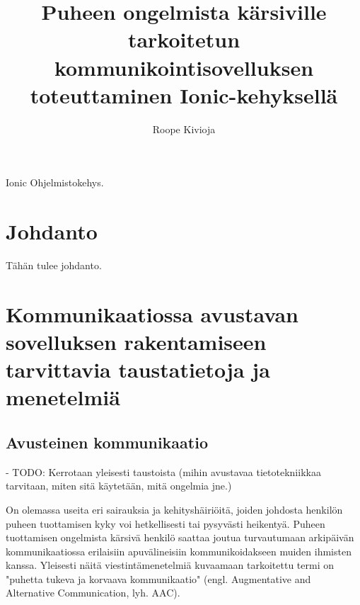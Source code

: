 \documentclass[utf8]{gradu3}
\begin{document}
\title{Puheen ongelmista kärsiville tarkoitetun kommunikointisovelluksen toteuttaminen Ionic-kehyksellä}

\author{Roope Kivioja}


\maketitle

\begin{thetermlist}
\item[Ionic] Ohjelmistokehys.
\end{thetermlist}

\mainmatter

\chapter{Johdanto}

Tähän tulee johdanto.

\chapter{Kommunikaatiossa avustavan sovelluksen rakentamiseen tarvittavia taustatietoja ja menetelmiä}

\section{Avusteinen kommunikaatio}

- TODO: Kerrotaan yleisesti taustoista (mihin avustavaa tietotekniikkaa tarvitaan, miten sitä käytetään, mitä ongelmia jne.)

On olemassa useita eri sairauksia ja kehityshäiriöitä, joiden johdosta henkilön puheen tuottamisen kyky voi hetkellisesti tai pysyvästi heikentyä. Puheen tuottamisen ongelmista kärsivä henkilö saattaa joutua turvautumaan arkipäivän kommunikaatiossa erilaisiin apuvälineisiin kommunikoidakseen muiden ihmisten kanssa. Yleisesti näitä viestintämenetelmiä kuvaamaan tarkoitettu termi on "puhetta tukeva ja korvaava kommunikaatio" (engl. Augmentative and Alternative Communication, lyh. AAC).
\end{document}
